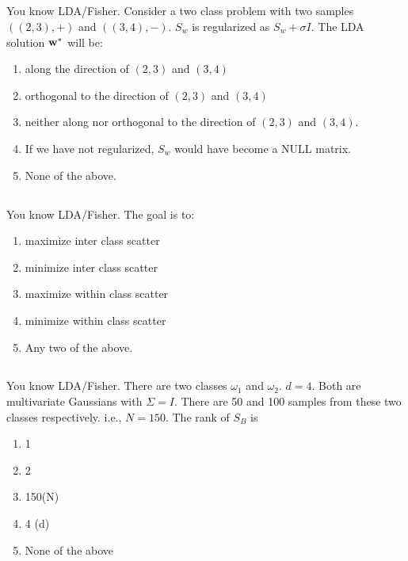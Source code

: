 \begin{frame}
\section{}
You know LDA/Fisher. Consider a two class problem with two samples $((2,3),+)$ and $((3,4),-)$. $S_w$ is regularized as
$S_w + \sigma I$. The LDA solution ${\bf w}^*$ will be:
\begin{enumerate}[label=(\Alph*)]
\item along the direction of $(2,3)$ and $(3,4)$     %
\item orthogonal to the direction of $(2,3)$ and $(3,4)$
\item neither along nor orthogonal to
the direction of $(2,3)$ and $(3,4)$.
\item If we have not regularized, $S_w$ would have become a NULL matrix.     %
\item None of the above.  %
\end{enumerate}
\end{frame}

\begin{frame}
\section{}
You know LDA/Fisher. The goal is to:

\begin{enumerate}[label=(\Alph*)]
\item maximize inter class scatter    %
\item minimize inter class scatter
\item maximize within class scatter
\item minimize within class scatter   %
\item Any two of the above.  %
\end{enumerate}
\end{frame}

\begin{frame}
\section{}
You know LDA/Fisher.
There are two classes $\omega_1$ and $\omega_2$. $d=4$. Both are multivariate Gaussians with $\Sigma = I$. There are 50 and 100 samples from these two classes respectively. i.e., $N=150$.
The rank of $S_B$ is
\begin{enumerate}[label=(\Alph*)]
\item 1   %
\item 2
\item 150(N)
\item 4 (d)
\item None of the above   %
\end{enumerate}
\end{frame}


